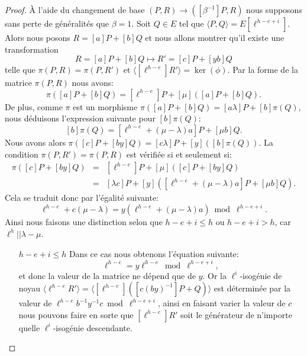 \documentclass[10pt,a4paper]{book}
\theoremstyle{plain}
\theoremstyle{definition}
\theoremstyle{definition}
\theoremstyle{definition}
\theoremstyle{definition}
\theoremstyle{definition}
\theoremstyle{remark}
\theoremstyle{remark}
\theoremstyle{definition}
\begin{document}
\begin{proof}%
\`A l'aide du changement de base $(P,R) \rightarrow ([\beta^{-1}]P,R)$ nous 
supposons sans perte de généralités que $\beta =1$.
Soit $Q \in E$ tel que $\langle P,Q \rangle = E[\ell^{h-e+i}]$. 
Alors nous posons $R=[a]P+[b]Q$ et nous allons montrer qu'il existe une 
transformation \begin{equation*}
R=[a]P+[b]Q \mapsto R'=[c]P+[yb]Q
\end{equation*}
telle que $\pi(P,R)=\pi(P,R')$ et $\langle [\ell^{h-e}]R' \rangle = \ker(\phi)$.
\newline
Par la forme de la matrice $\pi(P,R)$ nous avons:
\[ \pi([a]P+[b]Q)=[\ell^{h-e}] P + [\mu] ([a]P+[b]Q).\]
De plus, comme $\pi$ est un morphisme $\pi([a]P+[b]Q)=[a \lambda ]P + [b] 
\pi(Q)$, nous déduisons l'expression suivante pour $[b]\pi(Q)$:
\[ [b] \pi(Q)=[\ell^{h-e} + (\mu - \lambda)a]P + [\mu b] Q. \]
Nous avons alors $\pi([c]P+[by]Q)=[c\lambda]P+[y]([b]\pi(Q))$. La condition 
$\pi(P,R')=\pi(P,R)$ est vérifiée si et seulement si:
\begin{eqnarray*}
\pi([c]P+[by]Q) &=& [\ell^{h-e}] P + [\mu]([c]P+[by]Q) \\
				&=& [\lambda c]P + [y]([\ell^{h-e} + (\mu - \lambda)a]P + [\mu b] Q).
\end{eqnarray*}
Cela se traduit donc par l'égalité suivante:
\[ \ell^{h-e} + c(\mu-\lambda)=y(\ell^{h-e}+(\mu - \lambda )a) \bmod \ell^{h-e+i}. \]
Ainsi nous faisons une distinction selon que $h-e+i \leqslant h$ ou 
$h-e+i > h$, car $\ell^h || \lambda - \mu$. 

\begin{itemize}
\item[$h-e+i \leqslant h$] %
Dans ce cas nous obtenons l'équation suivante:
\[ \ell^{h-e} = y \ell^{h-e}  \bmod \ell^{h-e+i}, \]
et donc la valeur de la matrice ne dépend que de $y$. Or la
$\ell^i$-isogénie de noyau $\langle \ell^{h-e}R' \rangle= \langle [\ell^{h-e}]
([c(by)^{-1}]P+Q) \rangle$ est déterminée par la 
valeur de $\ell^{h-e}b^{-1}y^{-1}c \bmod \ell^{h-e+i}$, ainsi en faisant 
varier la valeur de $c$ nous pouvons faire en sorte que $[\ell^{h-e}]R'$ soit le 
générateur de n'importe quelle $\ell^{i}$-isogénie descendante.


\end{itemize}
\end{proof}
\end{document}
